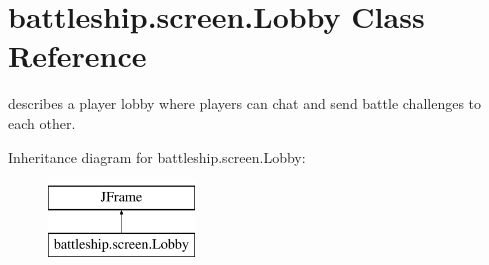 \hypertarget{classbattleship_1_1screen_1_1Lobby}{}\section{battleship.\+screen.\+Lobby Class Reference}
\label{classbattleship_1_1screen_1_1Lobby}


describes a player lobby where players can chat and send battle challenges to each other.  


Inheritance diagram for battleship.\+screen.\+Lobby\+:\begin{figure}[H]
\begin{center}
\leavevmode
\includegraphics[height=2.000000cm]{classbattleship_1_1screen_1_1Lobby}
\end{center}
\end{figure}
